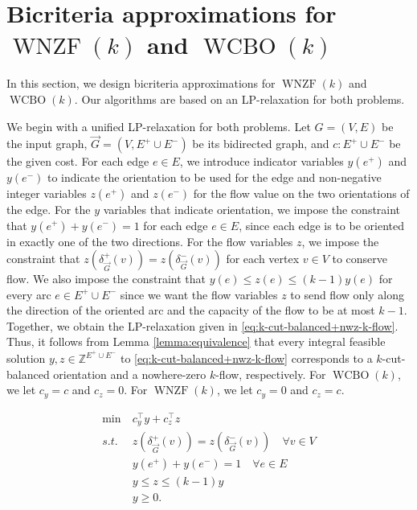 \documentclass[11pt]{article}
\newcommand{\Z}{\mathbb{Z}}
\begin{document}
\section{Bicriteria approximations for $\operatorname{WNZF}(k)$ and $\operatorname{WCBO}(k)$}\label{sec:algo-WNZF+WCBO}
In this section, we design bicriteria approximations for $\operatorname{WNZF}(k)$ and $\operatorname{WCBO}(k)$. Our algorithms are based on an LP-relaxation for both problems. 

We begin with a unified LP-relaxation for both problems. 
Let $G=(V, E)$ be the input graph, $\vec{G}=(V,E^+\cup E^-)$ be its bidirected graph, and $c: E^+ \cup E^-$ be the given cost. For each edge $e\in E$, we introduce indicator variables $y(e^+)$ and $y(e^-)$ to indicate the orientation to be used for the edge and non-negative integer variables $z(e^+)$ and $z(e^-)$ for the flow value on the two orientations of the edge. For the $y$ variables that indicate orientation, we impose the constraint that $y(e^+) + y(e^-)=1$ for each edge $e\in E$, since each edge is to be oriented in exactly one of the two directions. For the flow variables $z$, we impose the constraint that $z(\delta_{\vec{G}}^+(v))=z(\delta_{\vec{G}}^-(v))$ for each vertex $v\in V$ to conserve flow. We also impose the constraint that $y(e)\le z(e)\le (k-1)y(e)$ for every arc $e\in E^+\cup E^-$ since we want the flow variables $z$ to send flow only along the direction of the oriented arc and the capacity of the flow to be at most $k-1$. Together, we obtain the LP-relaxation given in \eqref{eq:k-cut-balanced+nwz-k-flow}. 
Thus, it follows from Lemma \ref{lemma:equivalence} that every integral feasible solution $y,z\in \Z^{E^+\cup E^-}$ to \eqref{eq:k-cut-balanced+nwz-k-flow} corresponds to a $k$-cut-balanced orientation and a nowhere-zero $k$-flow, respectively. 
For $\operatorname{WCBO}(k)$, we let $c_y=c$ and $c_z=0$. For $\operatorname{WNZF}(k)$, we let $c_y=0$ and $c_z=c$.

\begin{equation}\label{eq:k-cut-balanced+nwz-k-flow}
    \begin{aligned}
    \min~&c_y^\intercal y+c_z^\intercal z\\
    s.t.~&z(\delta_{\vec{G}}^+(v))=z(\delta_{\vec{G}}^-(v))\quad \forall v\in V\\
    &y(e^+)+y(e^-)=1\quad \forall e\in E\\
    &y\leq z\leq (k-1)y\\
        &y\geq 0.
    \end{aligned}
\end{equation}
\end{document}
